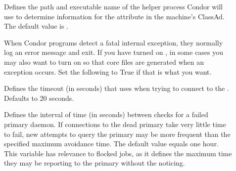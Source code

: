 \begin{description}
\item[] \label{param:CkptProbe}
  Defines the path and executable name of the helper process Condor will use to
  determine information for the  attribute
  in the machine's ClassAd. 
  The default value is .

\item[] \label{param:AbortOnException}
  When Condor programs detect a fatal internal exception, they
  normally log an error message and exit.  If you have turned on
  , in some cases you may also want to turn
  on  so that core files are generated
  when an exception occurs.  Set the following to True if that is what
  you want.

\item[] \label{param:QQueryTimeout}
  Defines the timeout (in seconds) that  uses when trying to
  connect to the .  Defaults to 20 seconds.

\item[]
\label{param:DeadCollectorMaxAvoidanceTime} Defines the interval of time
  (in seconds) between checks for a failed primary  daemon.
  If connections to the dead primary  take very
  little time to fail, new attempts to query the primary  may
  be more frequent than the specified maximum avoidance time.
  The default value equals one hour.
  This variable has relevance to flocked jobs, as it defines 
  the maximum time they may be reporting to the primary 
  without the  noticing.


\end{description}
